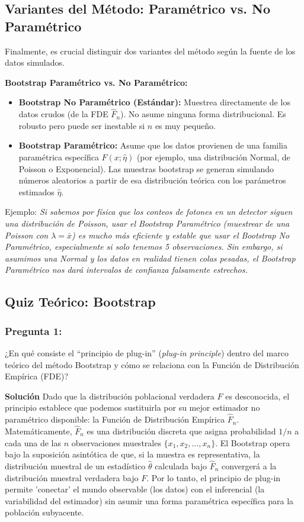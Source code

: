 \documentclass[a4paper]{article}
\begin{document}
\subsection{Variantes del Método: Paramétrico vs. No Paramétrico}

Finalmente, es crucial distinguir dos variantes del método según la fuente de los datos simulados.

\textbf{Bootstrap Paramétrico vs. No Paramétrico:}
\begin{itemize}
    \item \textbf{Bootstrap No Paramétrico (Estándar):} Muestrea directamente de los datos crudos (de la FDE $\hat{F}_n$). No asume ninguna forma distribucional. Es robusto pero puede ser inestable si $n$ es muy pequeño.
    \item \textbf{Bootstrap Paramétrico:} Asume que los datos provienen de una familia paramétrica específica $F(x; \hat{\eta})$ (por ejemplo, una distribución Normal, de Poisson o Exponencial). Las muestras bootstrap se generan simulando números aleatorios a partir de esa distribución teórica con los parámetros estimados $\hat{\eta}$.
\end{itemize}

Ejemplo: \textit{Si sabemos por física que los conteos de fotones en un detector siguen una distribución de Poisson, usar el Bootstrap Paramétrico (muestrear de una Poisson con $\lambda = \bar{x}$) es mucho más eficiente y estable que usar el Bootstrap No Paramétrico, especialmente si solo tenemos 5 observaciones. Sin embargo, si asumimos una Normal y los datos en realidad tienen colas pesadas, el Bootstrap Paramétrico nos dará intervalos de confianza falsamente estrechos.}

\newpage

\subsection{Quiz Teórico: Bootstrap}

\subsubsection{Pregunta 1:} ¿En qué consiste el ``principio de plug-in'' (\textit{plug-in principle}) dentro del marco teórico del método Bootstrap y cómo se relaciona con la Función de Distribución Empírica (FDE)?

\textbf{Solución}
Dado que la distribución poblacional verdadera $F$ es desconocida, el principio establece que podemos sustituirla por su mejor estimador no paramétrico disponible: la Función de Distribución Empírica $\hat{F}_n$. Matemáticamente, $\hat{F}_n$ es una distribución discreta que asigna probabilidad $1/n$ a cada una de las $n$ observaciones muestrales $\{x_1, x_2, \dots, x_n\}$. El Bootstrap opera bajo la suposición asintótica de que, si la muestra es representativa, la distribución muestral de un estadístico $\hat{\theta}$ calculada bajo $\hat{F}_n$ convergerá a la distribución muestral verdadera bajo $F$. Por lo tanto, el principio de plug-in permite 'conectar' el mundo observable (los datos) con el inferencial (la variabilidad del estimador) sin asumir una forma paramétrica específica para la población subyacente.
\end{document}
